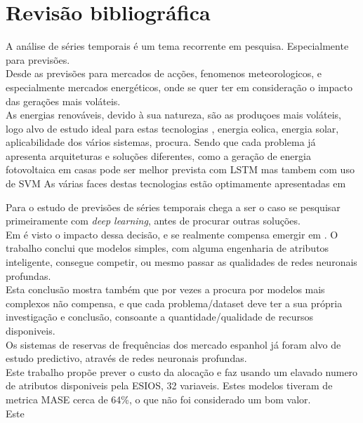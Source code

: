 \chapter{Revisão bibliográfica}

A análise de séries temporais é um tema recorrente em pesquisa. Especialmente para previsões.\\
Desde as previsões para mercados de acções\cite{Bhandari2022}, fenomenos meteorologicos\cite{Wang2019}, e especialmente mercados energéticos, onde se quer ter em consideração o impacto das gerações mais voláteis. \\
As energias renováveis, devido à sua natureza, são as produçoes mais voláteis, logo alvo de estudo ideal para estas tecnologias\cite{Lu2015}
, energia eolica\cite{Sun2022}, energia solar\cite{Rajasundrapandiyanleebanon2023}, aplicabilidade dos vários sistemas\cite{Ahmad2020}, procura\cite{Antonopoulos2020}.
Sendo que cada problema já apresenta arquiteturas e soluções diferentes, como a geração de energia fotovoltaica em casas pode ser melhor prevista com LSTM\cite{Costa2022} mas tambem com uso de SVM\cite{Meenal2018}
As várias faces destas tecnologias estão optimamente apresentadas em\cite{Benti2023}



Para o estudo de previsões de séries temporais chega a ser o caso se pesquisar primeiramente com \textit{deep learning}, antes de procurar outras soluções.\\
Em \cite{Elsayed} é visto o impacto dessa decisão, e se realmente compensa emergir em . O trabalho conclui que modelos simples, com alguma engenharia de atributos inteligente, consegue competir, ou mesmo passar as qualidades de redes neuronais profundas. \\
Esta conclusão mostra também que por vezes a procura por modelos mais complexos não compensa, e que cada problema/dataset deve ter a sua própria investigação e conclusão, consoante a quantidade/qualidade de recursos disponiveis. \\


Os sistemas de reservas de frequências dos mercado espanhol já foram alvo de estudo predictivo, através de redes neuronais profundas\cite{miota2023}.\\
Este trabalho propõe prever o custo da alocação e faz usando um elavado numero de atributos disponiveis pela ESIOS, 32 variaveis. Estes modelos tiveram de metrica MASE cerca de 64\%, o que não foi considerado um bom valor.\\
Este 

